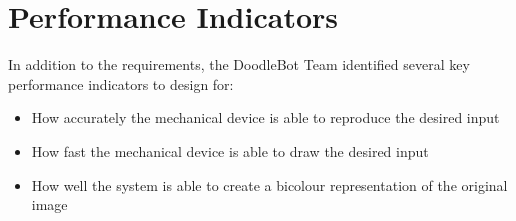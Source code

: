 \section{Performance Indicators}
In addition to the requirements, the DoodleBot Team identified several key performance indicators to design for:

	\begin{itemize}
		\item How accurately the mechanical device is able to reproduce the desired input
		\item How fast the mechanical device is able to draw the desired input
		\item How well the system is able to create a bicolour representation of the original image
	\end{itemize}